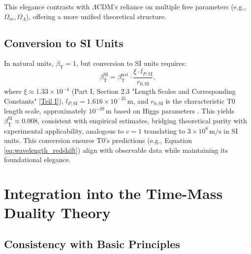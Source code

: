 \documentclass[12pt,a4paper]{article}
\newcommand{\betaT}{\beta_{\text{T}}}
\begin{document}
	This elegance contrasts with \(\Lambda\)CDM’s reliance on multiple free parameters (e.g., \(\Omega_m, \Omega_{\Lambda}\)), offering a more unified theoretical structure.
	
	\subsection{Conversion to SI Units}
	\label{subsec:conversion_si}
	
	In natural units, \(\betaT = 1\), but conversion to SI units requires:
	\begin{equation}
		\betaT^{\text{SI}} = \betaT^{\text{nat}} \cdot \frac{\xi \cdot l_{P,\text{SI}}}{r_{0,\text{SI}}},
		\label{eq:beta_conversion}
	\end{equation}
	where \(\xi \approx 1.33 \times 10^{-4}\) (Part I, Section 2.3 "Length Scales and Corresponding Constants" \href{https://github.com/jpascher/T0-Time-Mass-Duality/tree/main/2/pdf/English/Bridging Quantum Mechanics and Relativity through Time-Mass Duality Part I Theoretical Foundations_en.pdf}{[Teil I]}), \(l_{P,\text{SI}} = 1.616 \times 10^{-35} \, \text{m}\), and \(r_{0,\text{SI}}\) is the characteristic T0 length scale, approximately \(10^{-39} \, \text{m}\) based on Higgs parameters \cite{pascher_alphabeta_2025}. This yields \(\betaT^{\text{SI}} \approx 0.008\), consistent with empirical estimates, bridging theoretical purity with experimental applicability, analogous to \(c = 1\) translating to \(3 \times 10^8 \, \text{m/s}\) in SI units. This conversion ensures T0’s predictions (e.g., Equation \ref{eq:wavelength_redshift}) align with observable data while maintaining its foundational elegance.
	
	\section{Integration into the Time-Mass Duality Theory}
	\label{sec:integration_t0}
	
	\subsection{Consistency with Basic Principles}
	\label{subsec:consistency_principles}
	
\end{document}
